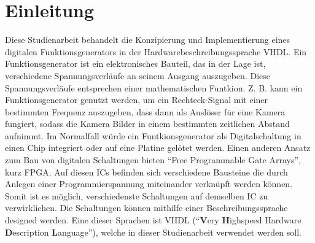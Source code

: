 \chapter[Einleitung]{Einleitung\raisebox{.3\baselineskip}{\normalsize \footnotemark}}

Diese Studienarbeit behandelt die Konzipierung und Implementierung eines
digitalen Funktionsgenerators in der Hardwarebeschreibungssprache VHDL.
Ein Funktionsgenerator ist ein elektronisches Bauteil, das in der Lage ist,
verschiedene Spannungsverläufe an seinem Ausgang auszugeben. Diese
Spannungsverläufe entsprechen einer mathematischen Funtkion. Z. B. kann ein
Funktionsgenerator genutzt werden, um ein Rechteck-Signal mit einer bestimmten
Frequenz auszugeben, dass dann als Auslöser für eine Kamera fungiert, sodass die Kamera Bilder in einem bestimmten zeitlichen Abstand aufnimmt.
Im Normalfall würde ein Funtkionsgenerator als Digitalschaltung in einen Chip
integriert oder auf eine Platine gelötet werden. Einen anderen Ansatz zum Bau
von digitalen Schaltungen bieten ``Free Programmable Gate Arrays'', kurz FPGA.
Auf diesen ICs befinden sich verschiedene Bausteine die durch Anlegen einer
Programmierspannung miteinander verknüpft werden können. Somit ist es möglich,
verschiedenste Schaltungen auf demselben IC zu verwirklichen.
Die Schaltungen können mithilfe einer Beschreibungssprache designed werden.
Eine dieser Sprachen ist VHDL (``\textbf{V}ery \textbf{H}ighspeed Hardware \textbf{D}escription \textbf{L}anguage''), welche in dieser Studienarbeit verwendet werden soll. 

